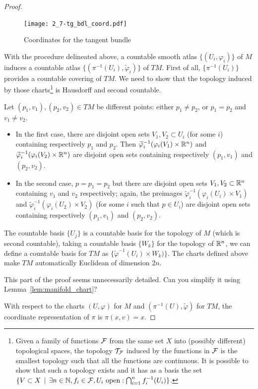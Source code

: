 \begin{proof}
	\begin{figure}[htp]
		\texttt{[image: 2\_7-tg\_bdl\_coord.pdf]}
		\caption{Coordinates for the tangent bundle}
	\end{figure}

	With the procedure delineated above, a countable smooth atlas $\{(U_i, \varphi_i)\}$ of $M$ induces a countable atlas $\{(\pi^{-1}(U_i), \widetilde\varphi_i)\}$ of $TM$.
	First of all, $\{\pi^{-1}(U_i)\}$ provides a countable covering of $TM$.
	We need to show that the topology induced by those charts\footnote{Given a family of functions $\mathcal{F}$ from the same set $X$ into (possibly different) topological spaces, the topology $\mathcal{T}_{\mathcal{F}}$ induced by the functions in $\mathcal{F}$ is the smallest topology such that all the functions are continuous. It is possible to show that such a topology exists and it has as a basis the set $\{V\subset X \,\mid\, \exists n\in\mathbb{N}, f_i\in\mathcal{F}, U_i \mbox{ open} : \bigcap_{i=1}^n f_i^{-1}(U_i) \}$.} is Hausdorff and second countable.

	Let $(p_1, v_1), (p_2, v_2) \in TM$ be different points: either $p_1\neq p_2$, or $p_1 = p_2$ and $v_1 \neq v_2$.
	\begin{itemize}
		\item In the first case, there are disjoint open sets $V_1, V_2 \subset U_i$ (for some $i$) containing respectively $p_1$ and $p_2$.
		      Then $\widetilde\varphi_i^{-1}(\varphi_i(V_1)\times\mathbb{R}^n)$ and $\widetilde\varphi_i^{-1}(\varphi_i(V_2)\times\mathbb{R}^n)$ are disjoint open sets containing respectively $(p_1, v_1)$ and $(p_2, v_2)$.
		\item In the second case, $p=p_1=p_2$ but there are disjoint open sets $V_1,V_2\subset \mathbb{R}^n$ containing $v_1$ and $v_2$ respectively;
		      again, the preimages $\widetilde\varphi_i^{-1}(\varphi_i(U_i)\times V_1)$ and $\widetilde\varphi_i^{-1}(\varphi_i(U_2)\times V_2)$ (for some $i$ such that $p\in U_i$) are disjoint open sets containing respectively $(p_1, v_1)$ and $(p_2, v_2)$.
	\end{itemize}

	The countable basis $\{U_j\}$ is a countable basis for the topology of $M$ (which is second countable), taking a countable basis $\{W_k\}$ for the topology of $\mathbb{R}^n$, we can define a countable basis for $TM$ as $\{\widetilde\varphi^{-1}(U_i)\times W_k)\}$.
	The charts defined above make $TM$ automatically Euclidean of dimension $2n$.

	\begin{exercise}
		This part of the proof seems unnecessarily detailed.
		Can you simplify it using Lemma~\ref{lem:manifold_chart}?
	\end{exercise}

	 With respect to the charts $(U,\varphi)$ for $M$ and $(\pi^{-1}(U), \widetilde\varphi)$ for $TM$, the coordinate representation of $\pi$ is $\pi(x,v) = x$.
\end{proof}

